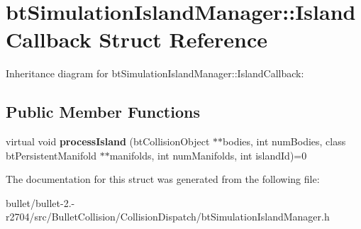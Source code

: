 \hypertarget{structbt_simulation_island_manager_1_1_island_callback}{\section{bt\+Simulation\+Island\+Manager\+:\+:Island\+Callback Struct Reference}
\label{structbt_simulation_island_manager_1_1_island_callback}
}


Inheritance diagram for bt\+Simulation\+Island\+Manager\+:\+:Island\+Callback\+:
\subsection*{Public Member Functions}
\begin{DoxyCompactItemize}
\item 
\hypertarget{structbt_simulation_island_manager_1_1_island_callback_a2c3ac38c6a84b4422b0d307329922efd}{virtual void {\bfseries process\+Island} (bt\+Collision\+Object $\ast$$\ast$bodies, int num\+Bodies, class bt\+Persistent\+Manifold $\ast$$\ast$manifolds, int num\+Manifolds, int island\+Id)=0}\label{structbt_simulation_island_manager_1_1_island_callback_a2c3ac38c6a84b4422b0d307329922efd}

\end{DoxyCompactItemize}


The documentation for this struct was generated from the following file\+:\begin{DoxyCompactItemize}
\item 
bullet/bullet-\/2.-\/r2704/src/\+Bullet\+Collision/\+Collision\+Dispatch/bt\+Simulation\+Island\+Manager.\+h\end{DoxyCompactItemize}
